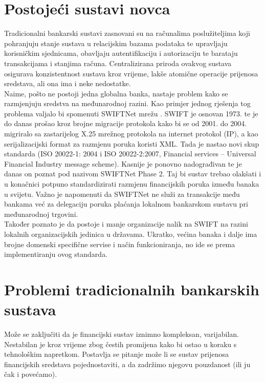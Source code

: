 \documentclass[utf8, zavrsni]{fer}
\begin{document}
\section{Postojeći sustavi novca}
Tradicionalni bankarski sustavi zasnovani su na računalima poslužiteljima koji pohranjuju stanje sustava u relacijskim bazama podataka te upravljaju korisničkim sjednicama, obavljaju autentifikaciju i autorizaciju te barataju transakcijama i stanjima računa. Centralizirana priroda ovakvog sustava osigurava konzistentnost sustava kroz vrijeme, lakše atomične operacije prijenosa sredstava, ali ona ima i neke nedostatke. \\
Naime, pošto ne postoji jedna globalna banka, nastaje problem kako se razmjenjuju sredstva na međunarodnoj razini. Kao primjer jednog rješenja tog problema valjalo bi spomenuti SWIFTNet mrežu \cite{enwiki:1021608159}. SWIFT je osnovan 1973. te je do danas prošao kroz brojne migracije protokola kako bi se od 2001. do 2004. migriralo sa zastarijelog X.25 mrežnog protokola na internet protokol (IP), a kao serijalizacijski format za razmjenu poruka koristi XML. Tada je nastao novi skup standarda (ISO 20022-1: 2004 i ISO 20022-2:2007, Financial services – Universal Financial Industry message scheme). Kasnije je ponovno nadograđivan te je danas on poznat pod nazivom SWIFTNet Phase 2. Taj bi sustav trebao olakšati i u konačnici potpuno standardizirati razmjenu financijskih poruka između banaka u svijetu. Važno je napomenuti da SWIFTNet ne služi za transakcije među bankama već za delegaciju poruka plaćanja lokalnom bankarskom sustavu pri međunarodnoj trgovini. \\ 

Također poznato je da postoje i manje organizacije nalik na SWIFT na razini lokalnih organizacijskih jedinica u državama. Ukratko, većina banaka i dalje ima brojne domenski specifične servise i način funkcioniranja, no ide se prema implementiranju ovog standarda.

\section{Problemi tradicionalnih bankarskih sustava}
	
Može se zaključiti da je financijski sustav iznimno kompleksan, varijabilan. Nestabilan je kroz vrijeme zbog čestih promijena kako bi ostao u koraku s tehnološkim napretkom. Postavlja se pitanje može li se sustav prijenosa financijskih sredstava pojednostaviti, a da zadržimo njegovu pouzdanost (ili ju čak i povećamo). \\
\end{document}
